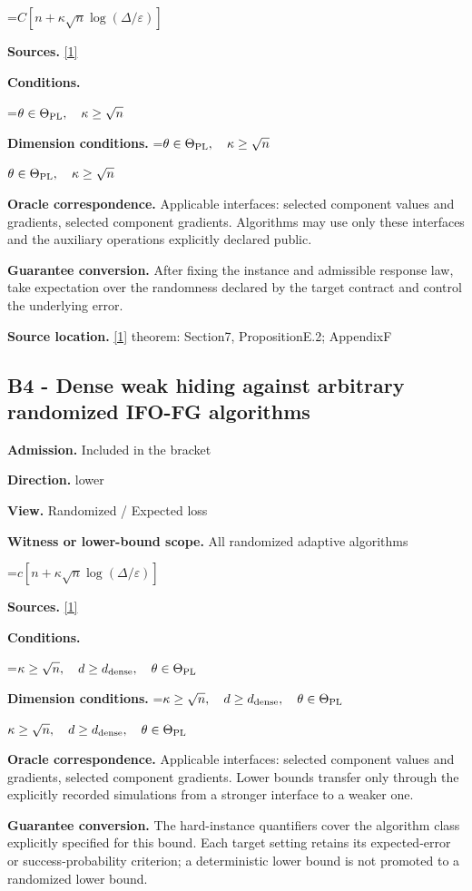\documentclass[10pt,a4paper]{article}
\newcommand{\AtlasMath}[1]{\par\begingroup\centering\setbox0=\hbox{$\displaystyle #1$}\ifdim\wd0>1.4\linewidth\typeout{ATLAS WIDE FORMULA: \the\wd0}\fi\ifdim\wd0>\linewidth\resizebox{\linewidth}{!}{\box0}\else\box0\fi\par\endgroup}
\newcommand{\AtlasInlineMath}[1]{\begingroup\setbox0=\hbox{$#1$}\ifdim\wd0>.4\linewidth\endgroup\AtlasMath{#1}\else\endgroup$#1$\fi}
\begin{document}
\AtlasMath{C[n+\kappa\sqrt n\log(\Delta/\varepsilon)]}
\textbf{Sources.} \href{https://arxiv.org/pdf/2609.00045v3}{[1]}

\textbf{Conditions.} 
\AtlasMath{\theta\in\Theta_{\rm PL},\quad\kappa\ge\sqrt n}


\textbf{Dimension conditions.} \AtlasInlineMath{\theta\in\Theta_{\rm PL},\quad\kappa\ge\sqrt n}

\textbf{Oracle correspondence.} Applicable interfaces: selected component values and gradients, selected component gradients. Algorithms may use only these interfaces and the auxiliary operations explicitly declared public.

\textbf{Guarantee conversion.} After fixing the instance and admissible response law, take expectation over the randomness declared by the target contract and control the underlying error.

\textbf{Source location.} \href{https://arxiv.org/pdf/2609.00045v3}{[1]} theorem: Section7, PropositionE.2; AppendixF

\subsection{B4 - Dense weak hiding against arbitrary randomized IFO-FG algorithms}
\textbf{Admission.} Included in the bracket

\textbf{Direction.} lower

\textbf{View.} Randomized / Expected loss

\textbf{Witness or lower-bound scope.} All randomized adaptive algorithms

\AtlasMath{c[n+\kappa\sqrt n\log(\Delta/\varepsilon)]}
\textbf{Sources.} \href{https://arxiv.org/pdf/2609.00045v3}{[1]}

\textbf{Conditions.} 
\AtlasMath{\kappa\ge\sqrt n,\quad d\ge d_{\rm dense},\quad\theta\in\Theta_{\rm PL}}


\textbf{Dimension conditions.} \AtlasInlineMath{\kappa\ge\sqrt n,\quad d\ge d_{\rm dense},\quad\theta\in\Theta_{\rm PL}}

\textbf{Oracle correspondence.} Applicable interfaces: selected component values and gradients, selected component gradients. Lower bounds transfer only through the explicitly recorded simulations from a stronger interface to a weaker one.

\textbf{Guarantee conversion.} The hard-instance quantifiers cover the algorithm class explicitly specified for this bound. Each target setting retains its expected-error or success-probability criterion; a deterministic lower bound is not promoted to a randomized lower bound.
\end{document}
